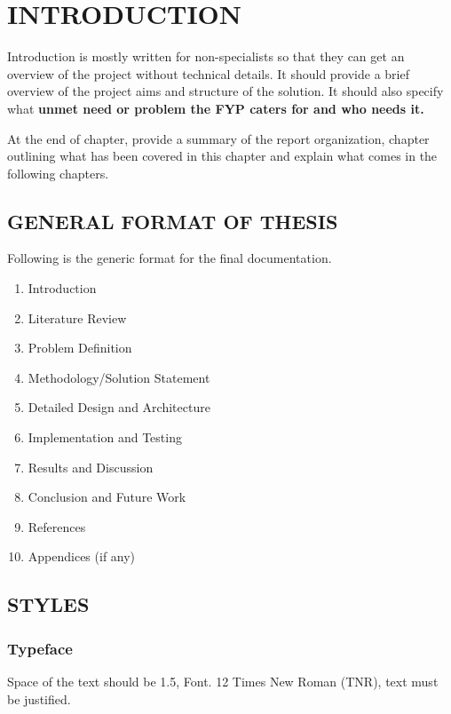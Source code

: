 \documentclass[12pt, a4paper]{report}
\begin{document}
\clearpage
{}

\chapter{INTRODUCTION}
Introduction is mostly written for non-specialists so that they can get an overview of the project without technical details. It should provide a brief overview of the project aims and structure of the solution. It should also specify what \textbf{unmet need or problem the FYP caters for and who needs it.} 

At the end of chapter, provide a summary of the report organization, chapter outlining what has been covered in this chapter and explain what comes in the following chapters. 

\section{GENERAL FORMAT OF THESIS}
Following is the generic format for the final documentation.
\begin{enumerate}
    \item Introduction
    \item Literature Review
    \item Problem Definition
    \item Methodology/Solution Statement
    \item Detailed Design and Architecture
    \item Implementation and Testing
    \item Results and Discussion
    \item Conclusion and Future Work
    \item References
    \item Appendices (if any)
\end{enumerate}

\section{STYLES}
\subsection{Typeface}
Space of the text should be 1.5, Font. 12 Times New Roman (TNR), text must be justified.
\end{document}
